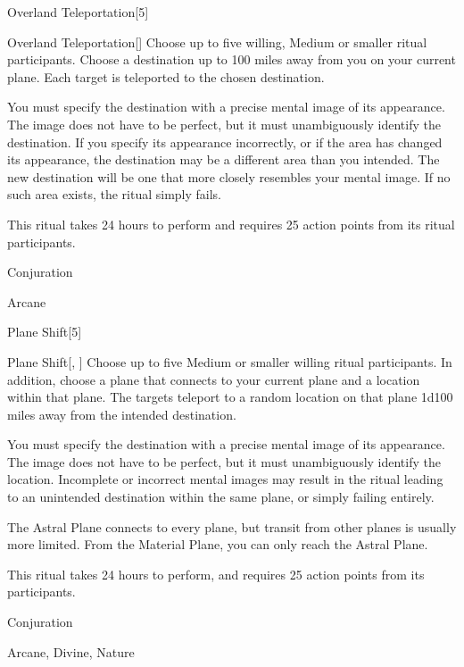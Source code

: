 \begin{spellsection}{Overland Teleportation}[5]


\begin{ability}{Overland Teleportation}[]
Choose up to five willing, Medium or smaller ritual participants.
Choose a destination up to 100 miles away from you on your current plane.
Each target is teleported to the chosen destination.

You must specify the destination with a precise mental image of its appearance.
The image does not have to be perfect, but it must unambiguously identify the destination.
If you specify its appearance incorrectly, or if the area has changed its appearance, the destination may be a different area than you intended.
The new destination will be one that more closely resembles your mental image.
If no such area exists, the ritual simply fails.

This ritual takes 24 hours to perform and requires 25 action points from its ritual participants.
\end{ability}




 Conjuration

 Arcane
\end{spellsection}


\begin{spellsection}{Plane Shift}[5]


\begin{ability}{Plane Shift}[, ]
Choose up to five Medium or smaller willing ritual participants.
In addition, choose a plane that connects to your current plane and a location within that plane.
The targets teleport to a random location on that plane 1d100 miles away from the intended destination.

You must specify the destination with a precise mental image of its appearance.
The image does not have to be perfect, but it must unambiguously identify the location.
Incomplete or incorrect mental images may result in the ritual leading to an unintended destination within the same plane, or simply failing entirely.

The Astral Plane connects to every plane, but transit from other planes is usually more limited.
From the Material Plane, you can only reach the Astral Plane.

This ritual takes 24 hours to perform, and requires 25 action points from its participants.
\end{ability}




 Conjuration

 Arcane, Divine, Nature
\end{spellsection}


